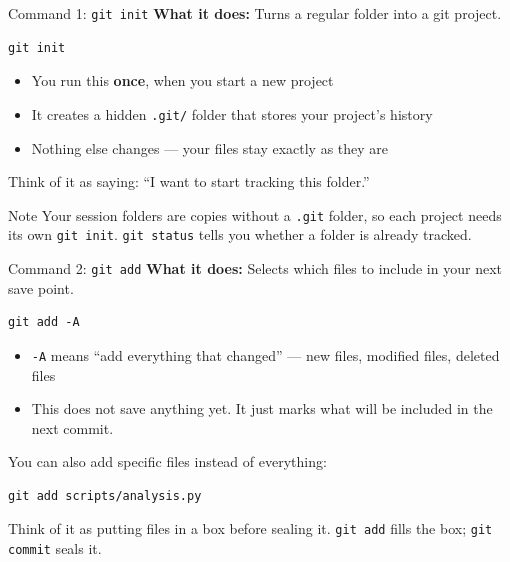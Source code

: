 \documentclass[aspectratio=169, 11pt]{beamer}
\begin{document}
\begin{frame}[fragile]{Command 1: \texttt{git init}}
  \textbf{What it does:} Turns a regular folder into a git project.

  \vspace{0.5em}
  \begin{lstlisting}
git init
  \end{lstlisting}

  \vspace{0.5em}
  \begin{itemize}
    \item You run this \textbf{once}, when you start a new project
    \item It creates a hidden \texttt{.git/} folder that stores your project's history
    \item Nothing else changes --- your files stay exactly as they are
  \end{itemize}

  \vspace{0.8em}
  Think of it as saying: ``I want to start tracking this folder.''

  \vspace{0.5em}
  \begin{block}{Note}
    Your session folders are copies without a \texttt{.git} folder, so each project needs its own \texttt{git init}. \texttt{git status} tells you whether a folder is already tracked.
  \end{block}
\end{frame}

\begin{frame}[fragile]{Command 2: \texttt{git add}}
  \textbf{What it does:} Selects which files to include in your next save point.

  \vspace{0.5em}
  \begin{lstlisting}
git add -A
  \end{lstlisting}

  \vspace{0.5em}
  \begin{itemize}
    \item \texttt{-A} means ``add everything that changed'' --- new files, modified files, deleted files
    \item This does not save anything yet. It just marks what will be included in the next commit.
  \end{itemize}

  \vspace{0.8em}
  You can also add specific files instead of everything:
  \begin{lstlisting}
git add scripts/analysis.py
  \end{lstlisting}

  \vspace{0.5em}
  Think of it as putting files in a box before sealing it. \texttt{git add} fills the box; \texttt{git commit} seals it.
\end{frame}
\end{document}
